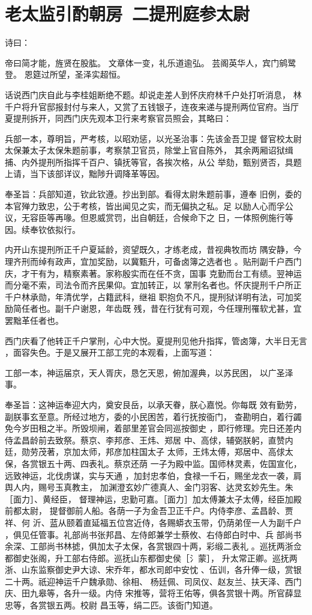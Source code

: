 \chapter{老太监引酌朝房~二提刑庭参太尉}

诗曰：

帝曰简才能，旌贤在股肱。
文章体一变，礼乐道逾弘。
芸阁英华人，宾门鹓鹭登。
恩筵过所望，圣泽实超恒。

话说西门庆自此与李桂姐断绝不题。却说走差人到怀庆府林千户处打听消息，
林千户将升官邸报封付与来人，又赏了五钱银子，连夜来递与提刑两位官府。当厅
夏提刑拆开，同西门庆先观本卫行来考察官员照会，其略曰：

兵部一本，尊明旨，严考核，以昭劝惩，以光圣治事：先该金吾卫提
督官校太尉太保兼太子太保朱题前事，考察禁卫官员，除堂上官自陈外，
其余两厢诏狱缉捕、内外提刑所指挥千百户、镇抚等官，各挨次格，从公
举劾，甄别贤否，具题上请，当下该部详议，黜陟升调降革等因。

奉圣旨：兵部知道，钦此钦遵。抄出到部。看得太尉朱题前事，遵奉
旧例，委的本官殚力致忠，公于考核，皆出闻见之实，而无偏执之私。足
以励人心而孚公议，无容臣等再喙。但恩威赏罚，出自朝廷，合候命下之
日，一体照例施行等因。续奉钦依拟行。

内开山东提刑所正千户夏延龄，资望既久，才练老成，昔视典牧而坊
隅安静，今理齐刑而绰有政声，宜加奖励，以冀甄升，可备卤簿之选者也
。贴刑副千户西门庆，才干有为，精察素著。家称殷实而在任不贪，国事
克勤而台工有绩。翌神运而分毫不索，司法令而齐民果仰。宜加转正，以
掌刑名者也。怀庆提刑千户所正千户林承勋，年清优学，占籍武科，继祖
职抱负不凡，提刑狱详明有法，可加奖励简任者也。副千户谢恩，年齿既
残，昔在行犹有可观，今任理刑罹软尤甚，宜罢黜革任者也。

西门庆看了他转正千户掌刑，心中大悦。夏提刑见他升指挥，管卤簿，大半日无言
，面容失色。于是又展开工部工完的本观看，上面写道：

工部一本，神运届京，天人胥庆，恳乞天恩，俯加渥典，以苏民困，
以广圣泽事。

奉圣旨：这神运奉迎大内，奠安艮岳，以承天眷，朕心嘉悦。你每既
效有勤劳，副朕事玄至意。所经过地方，委的小民困苦，着行抚按衙门，
查勘明白，着行蠲免今岁田租之半。所毁坝闸，着部里差官会同巡按御史
，即行修理。完日还差内侍孟昌龄前去致祭。蔡京、李邦彦、王炜、郑居
中、高俅，辅弼朕躬，直赞内廷，勋劳茂著，京加太师，邦彦加柱国太子
太师，王炜太傅，郑居中、高俅太保，各赏银五十两、四表礼。蔡京还荫
一子为殿中监。国师林灵素，佐国宣化，远致神运，北伐虏谋，实与天通
，加封忠孝伯，食禄一千石，赐坐龙衣一袭，肩舆人内，赐号玉真教主，
加渊澄玄妙广德真人、金门羽客、达灵玄妙先生。朱［面力］、黄经臣，
督理神运，忠勤可嘉。［面力］加太傅兼太子太傅，经臣加殿前都太尉，
提督御前人船。各荫一子为金吾卫正千户。内侍李彦、孟昌龄、贾祥、何
沂、蓝从颐着直延福五位宫近侍，各赐蟒衣玉带，仍荫弟侄一人为副千户
，俱见任管事。礼部尚书张邦昌、左侍郎兼学士蔡攸、右侍郎白时中、兵
部尚书余深、工部尚书林摅，俱加太子太保，各赏银四十两，彩缎二表礼
。巡抚两浙佥都御史张阁，升工部右侍郎。巡抚山东都御史侯［氵蒙］，
升太常正卿。巡抚两浙、山东监察御史尹大谅、宋乔年，都水司郎中安忱
、伍训，各升俸一级，赏银二十两。祇迎神运千户魏承勋、徐相、
杨廷佩、司凤仪、赵友兰、扶天泽、西门庆、田九皋等，各升一级。内侍
宋推等，营将王佑等，俱各赏银十两。所官薛显忠等，各赏银五两。校尉
昌玉等，绢二匹。该衙门知道。

